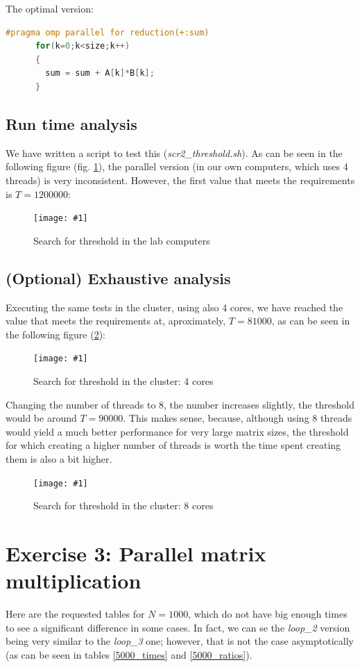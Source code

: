 \documentclass{article}
\newcommand{\myFigure}[4]{%
    \begin{figure}[!ht]
        \texttt{[image: \#1]}
        \centering
        \caption{#2}
        \label{#3}
    \end{figure}
}
\newcommand{\question}[1]{\subsection{#1}}
\begin{document}
The optimal version:

\begin{lstlisting}[language=C]
    #pragma omp parallel for reduction(+:sum)
      for(k=0;k<size;k++)
      {	
        sum = sum + A[k]*B[k];
      }
\end{lstlisting}

\pagebreak

\question{Run time analysis}

We have written a script to test this (\emph{scr2\_threshold.sh}). As can be seen in the following figure (fig. \ref{threshold}), the parallel version (in our own computers, which uses 4 threads) is very inconsistent. However, the first value that meets the requirements is $T=1200000$:

\myFigure{../material/outputs/out2_final/threshold0.png}{Search for threshold in the lab computers}{threshold}{.65}

\question{(Optional) Exhaustive analysis}

Executing the same tests in the cluster, using also 4 cores, we have reached the value that meets the requirements at, aproximately, $T=81000$, as can be seen in the following figure (\ref{threshold_cluster4}):

\myFigure{../material/outputs/out2_final/threshold_4proc.png}{Search for threshold in the cluster: 4 cores}{threshold_cluster4}{.65}

\pagebreak

Changing the number of threads to 8, the number increases slightly, the threshold would be around $T=90000$. This makes sense, because, although using 8 threads would yield a much better performance for very large matrix sizes, the threshold for which creating a higher number of threads is worth the time spent creating them is also a bit higher.

\myFigure{../material/outputs/out2_final/threshold_8proc.png}{Search for threshold in the cluster: 8 cores}{threshold_cluster8}{.66}


\pagebreak

\section{Exercise 3: Parallel matrix multiplication}

Here are the requested tables for $N=1000$, which do not have big enough times to see a significant difference in some cases. In fact, we can se the \emph{loop\_2} version being very similar to the \emph{loop\_3} one; however, that is not the case asymptotically (as can be seen in tables \ref{5000_times} and \ref{5000_ratios}).
\end{document}
